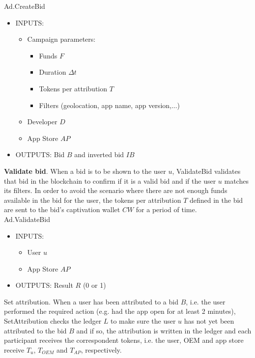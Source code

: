 \textsf{Ad.CreateBid}
\vspace{-0.35cm}
\begin{itemize}
	\item INPUTS:
	\vspace{-0.35cm}
	\begin{itemize}
		\item Campaign parameters:
		\begin{itemize}
			\item Funds $F$
			\item Duration $\Delta t$
			\item Tokens per attribution $T$
			\item Filters (geolocation, app name, app version,...)
		\end{itemize}
		\item Developer $D$
		\item App Store $AP$
	\end{itemize}
	\item OUTPUTS: Bid $B$ and inverted bid $IB$
\end{itemize}

\noindent \textbf{Validate bid}. When a bid is to be shown to the user $u$, \textsf{ValidateBid} validates that bid in the blockchain to confirm if it is a valid bid and if the user $u$ matches its filters. In order to avoid the scenario where there are not enough funds available in the bid for the user, the tokens per attribution $T$ defined in the bid are sent to the bid's captivation wallet $CW$ for a period of time. \\

\textsf{Ad.ValidateBid}
\vspace{-0.35cm}
\begin{itemize}
	\item INPUTS:
	\vspace{-0.35cm}
	\begin{itemize}
		\item User $u$
		\item App Store $AP$
	\end{itemize}
	\item OUTPUTS: Result $R$ (0 or 1)
\end{itemize}

\noindent \textsf{Set attribution}. When a user has been attributed to a bid $B$, i.e. the user performed the required action (e.g. had the app open for at least 2 minutes), \textsf{SetAttribution} checks the ledger $L$ to make sure the user $u$ has not yet been attributed to the bid $B$ and if so, the attribution is written in the ledger and each participant receives the correspondent tokens, i.e. the user, OEM and app store receive $T_u$, $T_{OEM}$ and $T_{AP}$, respectively. \\

